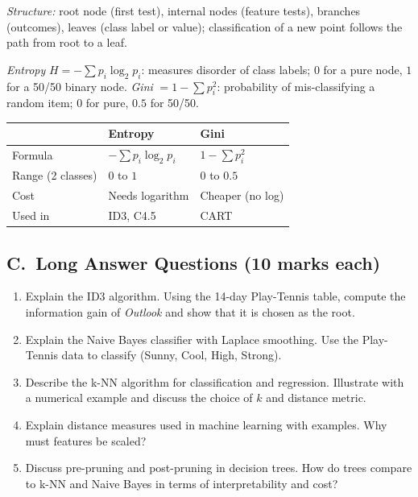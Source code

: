 \begin{modelans}
\emph{Structure:} root node (first test), internal nodes (feature tests), branches (outcomes), leaves (class label or value); classification of a new point follows the path from root to a leaf.\par
\emph{Entropy} $H=-\sum p_i\log_2p_i$: measures disorder of class labels; $0$ for a pure node, $1$ for a 50/50 binary node.
\emph{Gini} $=1-\sum p_i^2$: probability of mis-classifying a random item; $0$ for pure, $0.5$ for 50/50.\par
\begin{center}\small
\begin{tabular}{@{}lll@{}}
\toprule
 & \textbf{Entropy} & \textbf{Gini}\\
\midrule
Formula & $-\sum p_i\log_2 p_i$ & $1-\sum p_i^2$\\
Range (2 classes) & $0$ to $1$ & $0$ to $0.5$\\
Cost & Needs logarithm & Cheaper (no log)\\
Used in & ID3, C4.5 & CART\\
\bottomrule
\end{tabular}
\end{center}
\end{modelans}

\subsection*{C.\ Long Answer Questions (10 marks each)}
\begin{enumerate}
  \item Explain the ID3 algorithm. Using the 14-day Play-Tennis table, compute the information gain of \emph{Outlook} and show that it is chosen as the root. 
  \item Explain the Naive Bayes classifier with Laplace smoothing. Use the Play-Tennis data to classify (Sunny, Cool, High, Strong). 
  \item Describe the k-NN algorithm for classification and regression. Illustrate with a numerical example and discuss the choice of $k$ and distance metric. 
  \item Explain distance measures used in machine learning with examples. Why must features be scaled? 
  \item Discuss pre-pruning and post-pruning in decision trees. How do trees compare to k-NN and Naive Bayes in terms of interpretability and cost? 
\end{enumerate}

